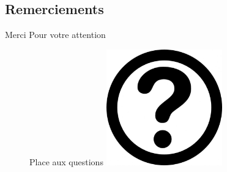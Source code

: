 \documentclass{beamer}
\begin{document}
\subsection{Remerciements}
\begin{frame}
	\begin{center}
	 \Huge Merci Pour votre attention
	 
	 \begin{figure}
		\Large Place aux questions
	  \includegraphics[width=5cm]{Images/interrogation.jpg}
	 \end{figure}

	 
	\end{center}
\end{frame}
\end{document}
